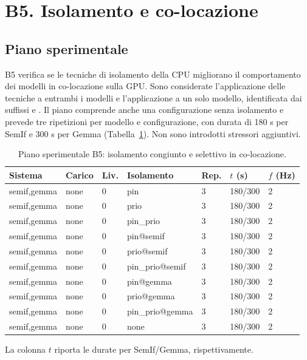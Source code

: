 \documentclass[conference]{IEEEtran}
\newcommand{\code}[1]{\texttt{\detokenize{#1}}}
\begin{document}
\section{B5. Isolamento e co-locazione}\label{sec:b5}

\subsection{Piano sperimentale}
B5 verifica se le tecniche di isolamento della CPU migliorano il comportamento dei modelli in co-locazione sulla GPU. Sono considerate l'applicazione delle tecniche a entrambi i modelli e l'applicazione a un solo modello, identificata dai suffissi \code{@semif} e \code{@gemma}. Il piano comprende anche una configurazione senza isolamento e prevede tre ripetizioni per modello e configurazione, con durata di 180 s per SemIf e 300 s per Gemma (Tabella~\ref{tab:b5}). Non sono introdotti stressori aggiuntivi.

\begin{table}[!htbp]
\centering
\caption{Piano sperimentale B5: isolamento congiunto e selettivo in co-locazione.}\label{tab:b5}
\scriptsize
\setlength{\tabcolsep}{2pt}
\begin{tabular*}{\columnwidth}{@{\extracolsep{\fill}}lllllll@{}}
\toprule
Sistema & Carico & Liv. & Isolamento & Rep. & $t$ (s) & $f$ (Hz) \\
\midrule
semif,gemma & none & 0 & pin & 3 & 180/300 & 2 \\
semif,gemma & none & 0 & prio & 3 & 180/300 & 2 \\
semif,gemma & none & 0 & pin\_prio & 3 & 180/300 & 2 \\
semif,gemma & none & 0 & pin@semif & 3 & 180/300 & 2 \\
semif,gemma & none & 0 & prio@semif & 3 & 180/300 & 2 \\
semif,gemma & none & 0 & pin\_prio@semif & 3 & 180/300 & 2 \\
semif,gemma & none & 0 & pin@gemma & 3 & 180/300 & 2 \\
semif,gemma & none & 0 & prio@gemma & 3 & 180/300 & 2 \\
semif,gemma & none & 0 & pin\_prio@gemma & 3 & 180/300 & 2 \\
semif,gemma & none & 0 & none & 3 & 180/300 & 2 \\
\bottomrule
\end{tabular*}
\par\smallskip
\parbox{0.97\columnwidth}{\scriptsize La colonna $t$ riporta le durate per SemIf/Gemma, rispettivamente.}
\end{table}
\end{document}
